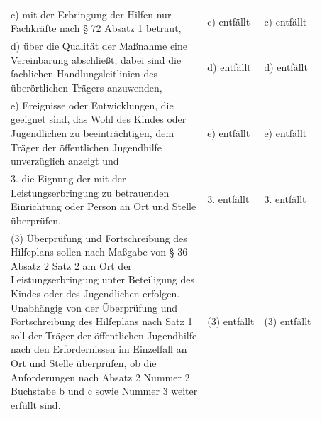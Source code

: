 \documentclass[10pt,a4paper,landscape]{article}
\begin{document}
\begin{longtable}{|L{8.2cm}|L{8.2cm}|L{8.2cm}|}
\hhline{|---|}
c)   \newline \textcolor{diffred}{mit der Erbringung der Hilfen nur  \newline Fachkräfte nach \S{} 72 Absatz 1 betraut,} & c)  entfällt & c)  entfällt \\
\hhline{|---|}
d)   \newline \textcolor{diffred}{über die Qualität der Maßnahme eine  \newline Vereinbarung abschließt; dabei sind die  \newline fachlichen Handlungsleitlinien des  \newline überörtlichen Trägers anzuwenden,} & d) entfällt & d) entfällt \\
\hhline{|---|}
e)   \newline \textcolor{diffred}{Ereignisse oder Entwicklungen, die  \newline geeignet sind, das Wohl des Kindes oder  \newline Jugendlichen zu beeinträchtigen, dem  \newline Träger der öffentlichen Jugendhilfe  \newline unverzüglich anzeigt und} & e) entfällt & e) entfällt \\
\hhline{|---|}
3.   \newline \textcolor{diffred}{die Eignung der mit der  \newline Leistungserbringung zu betrauenden  \newline Einrichtung oder Person an Ort und Stelle  \newline überprüfen.} & 3. entfällt & 3. entfällt \\
\hhline{|---|}
(3) \textcolor{diffred}{Überprüfung und Fortschreibung des  \newline Hilfeplans sollen nach Maßgabe von \S{} 36  \newline Absatz 2 Satz 2 am Ort der  \newline Leistungserbringung unter Beteiligung des  \newline Kindes oder des Jugendlichen erfolgen.  \newline Unabhängig von der Überprüfung und  \newline Fortschreibung des Hilfeplans nach Satz 1  \newline soll der Träger der öffentlichen Jugendhilfe  \newline nach den Erfordernissen im Einzelfall an  \newline Ort und Stelle überprüfen, ob die  \newline Anforderungen nach Absatz 2 Nummer 2  \newline Buchstabe b und c sowie Nummer 3 weiter  \newline erfüllt sind.} & (3) entfällt & (3) entfällt \\

\end{longtable}
\end{document}
